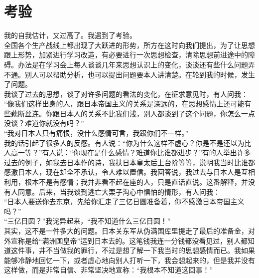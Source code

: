 \fancyhead[RO]{\thepage} %
\fancyhead[LE]{\thepage} %
\chapter*{考验}
我的自我估计，又过高了。我遇到了考验。\\

全国各个生产战线上都出现了大跃进的形势，所方在这时向我们提出，为了让思想跟上形势，加紧进行学习改造，有必要进行一次思想检查，清除思想前进途中的障碍。办法是在学习会上每人谈谈几年来思想认识上的变化，谈谈还有些什么问题弄不通。别人可以帮助分析，也可以提出问题要本人讲清楚。在轮到我的时候，发生了问题。\\

我谈了过去的思想，谈了对许多问题的看法的变化，在征求意见时，有人问我：\\

“像我们这样出身的人，跟日本帝国主义的关系是深远的，在思想感情上还可能有些藕断丝连。你跟日本人的关系不比我们浅，别人都谈到了这个问题，你怎么一点没谈？难道你就没有吗？”\\

“我对日本人只有痛恨，没什么感情可言，我跟你们不一样。”\\

我的话引起了很多人的反感。有人说：“你为什么这样不虚心？你是不是还以为比人高一等？”有人说：“你现在是什么感情？难道你比谁都进步？”有的人举出许多过去的例子，如我去日本作的诗，我扶日本皇太后上台阶等等，说明我当时比谁都感激日本人，现在却全不承认，令人难以置信。我回答说，我过去与日本人是互相利用，根本不是有感情；我并非看不起在座的人，只是直话直说。这番解释，并没有人同意。后来，当我谈到逃亡大栗子沟心中惧怕的情形，有人问我：\\

“日本人要送你去东京，先给你汇走了三亿日圆准备着，你不感激日本帝国主义吗？”\\

“三亿日圆？”我诧异起来，“我不知道什么三亿日圆！”\\

其实，这不是一件多大的问题。日本关东军从伪满国库里提走了最后的准备金，对外宣称是给“满洲国皇帝”运到日本去的。这笔钱我连一分钱都没看见过，别人都知道这件事，井不当做我的罪行，不过是想了解一下我当时的思想感情而已。我如果能够冷静地回忆一下，或者虚心地向别人打听一下，我会想起来的，但是我并没有这样做，而是非常自信、非常坚决地宣称：“我根本不知道这回事！”\\

